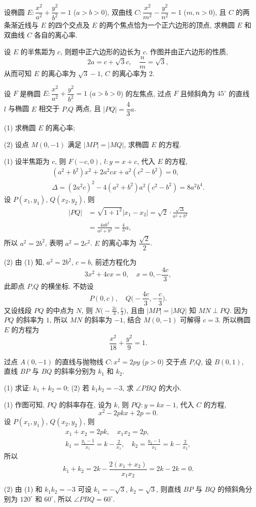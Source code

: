\begin{exercise}
    设椭圆 $E\colon \dfrac{x^2}{a^2}+ \dfrac{y^2}{b^2}=1$ ($a>b>0$), 双曲线 $C\colon \dfrac{x^2}{m^2}- \dfrac{y^2}{n^2}=1$ ($m,n>0$), 且 $C$ 的两条渐近线与 $E$ 的四个交点及 $E$ 的两个焦点恰为一个正六边形的顶点, 求椭圆 $E$ 和双曲线 $C$ 各自的离心率.
\end{exercise}
\beginsolution
    设 $E$ 的半焦距为 $c$, 则题中正六边形的边长为 $c$. 作图并由正六边形的性质,
    \[2a= c+\sqrt3c,\quad \frac{n}m= \sqrt3,\]
    从而可知 $E$ 的离心率为 $\sqrt3-1$, $C$ 的离心率为 $2$.
\endsolution

\begin{exercise}
    设 $F$ 是椭圆 $E\colon \dfrac{x^2}{a^2}+ \dfrac{y^2}{b^2}=1$ ($a>b>0$) 的左焦点, 过点 $F$ 且倾斜角为 $45^\circ$ 的直线 $l$ 与椭圆 $E$ 相交于 $P$,$Q$ 两点, 且 $|PQ|=\dfrac43 a$.
    
    (1) 求椭圆 $E$ 的离心率;
    
    (2) 设点 $M(0,-1)$ 满足 $|MP|=|MQ|$, 求椭圆 $E$ 的方程.
\end{exercise}
\beginsolution
    (1) 设半焦距为 $c$, 则 $F(-c,0)$, $l\colon y=x+c$, 代入 $E$ 的方程,
    \[\begin{gathered}
        (a^2+b^2)x^2+ 2a^2cx+ a^2(c^2-b^2)= 0,\\
        \Delta= (2a^2c)^2- 4(a^2+b^2)a^2(c^2-b^2)= 8a^2b^4.
    \end{gathered}\]
    设 $P(x_1,y_1)$, $Q(x_2,y_2)$, 则
    \[\begin{aligned}
        |PQ|&= \sqrt{1+1^2}|x_1-x_2|
            = \sqrt2\cdot\frac{\sqrt{\Delta}}{a^2+b^2}\\
        &= \frac{4ab^2}{a^2+b^2}= \frac43a,
    \end{aligned}\]
    所以 $a^2= 2b^2$, 表明 $a^2= 2c^2$. $E$ 的离心率为 $\dfrac{\sqrt2}2$.

    (2) 由 (1) 知, $a^2= 2b^2$, $c=b$, 前述方程化为
    \[3x^2+4cx= 0,\quad x=0,-\frac{4c}3,\]
    此即点 $P$,$Q$ 的横坐标. 不妨设
    \[P(0,c),\quad Q\biggl(-\frac{4c}3,-\frac{c}3\biggr).\]
    又设线段 $PQ$ 的中点为 $N$, 则 $N\biggl(-\frac{2c}3,\frac{c}3\biggr)$, 且由 $|MP|=|MQ|$ 知 $MN\perp PQ$. 因为 $PQ$ 的斜率为 $1$, 所以 $MN$ 的斜率为 $-1$, 结合 $M(0,-1)$ 可解得 $c=3$. 所以椭圆 $E$ 的方程为
    \[\frac{x^2}{18}+ \frac{y^2}9= 1.\]
\endsolution

\begin{exercise}
    过点 $A(0,-1)$ 的直线与抛物线 $C\colon x^2= 2py$ ($p>0$) 交于点 $P$,$Q$, 设 $B(0,1)$, 直线 $BP$ 与 $BQ$ 的斜率分别为 $k_1$ 和 $k_2$. 
    
    (1) 求证: $k_1+k_2= 0$;\qquad
    (2) 若 $k_1k_2= -3$, 求 $\angle PBQ$ 的大小.
\end{exercise}
\beginsolution
    (1) 作图可知, $PQ$ 的斜率存在, 设为 $k$, 则 $PQ\colon y= kx-1$, 代入 $C$ 的方程,
    \[x^2- 2pkx+ 2p= 0.\]
    设 $P(x_1,y_1)$, $Q(x_2,y_2)$, 则
    \[\begin{gathered}
        x_1+x_2= 2pk,\quad x_1x_2= 2p,\\
        k_1= \frac{y_1-1}{x_1}= k- \frac2{x_1},\quad
        k_2= \frac{y_2-1}{x_2}= k- \frac2{x_2},
    \end{gathered}\]
    所以
    \[k_1+k_2= 2k- \frac{2(x_1+x_2)}{x_1x_2}= 2k-2k= 0.\]

    (2) 由 (1) 和 $k_1k_2= -3$ 可设 $k_1= -\sqrt3$, $k_2= \sqrt3$, 则直线 $BP$ 与 $BQ$ 的倾斜角分别为 $120^\circ$ 和 $60^\circ$, 所以 $\angle PBQ= 60^\circ$.
\endsolution